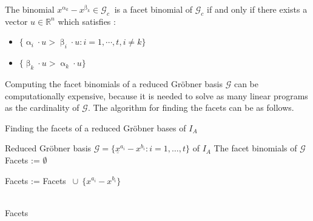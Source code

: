 \begin{env_definition}
\cite{tigers}
The binomial $x^{\upalpha_{k}}-x^{\upbeta_k} \in \mathcal{G}_c~$ is a facet binomial of $\mathcal{G}_c$ if and only if there exists a vector $u \in \mathbb{R}^{n}$ which satisfies :

\begin{itemize}
\item
$ \lbrace \upalpha_{i} \cdot u > \upbeta_{i} \cdot u : i = 1, \cdots , t, i \neq k \rbrace  
$
\item
$ \lbrace \upbeta_{k} \cdot u > \upalpha_{k} \cdot u \rbrace $
\end{itemize}


\end{env_definition}
Computing the facet binomials of a reduced Gröbner basis $\mathcal{G}$ can be computationally expensive, because it is needed to solve as many linear programs as the cardinality of $\mathcal{G}$. The algorithm for finding the facets can be as follows.

\label{facets}

\begin{algorithm}
\caption{Finding the facets of a reduced Gröbner bases of $I_A$ \cite{tigers}}
\label{alg:facetsLP}
\begin{algorithmic}[1]

\Input
Reduced Gröbner basis $ \mathcal{G} = \lbrace \underline{x}^{a_{i}} - {x}^{b_{i}} : i = 1,\dots,t  \rbrace $ of $I_A$
\Output The facet binomials of $\mathcal{G}$
\State Facets := $\emptyset$

\State Facets := Facets $~\cup~\{{x}^{a_{i}} - {x}^{b_{i}} \} $
\EndIf

\EndFor \\
\Return Facets
\end{algorithmic}
\end{algorithm}

